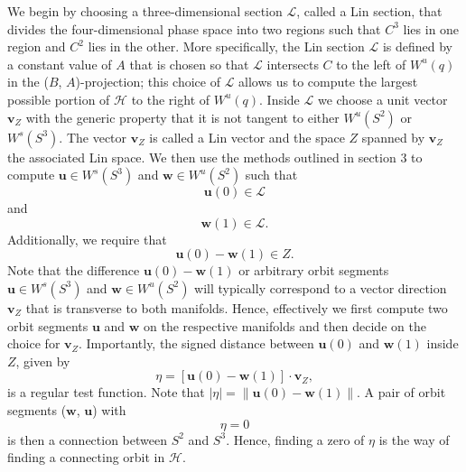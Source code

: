 \documentclass{ws-ijbc}
\begin{document}
We begin by choosing a three-dimensional section $\mathscr{L}$, called a Lin section, that divides the four-dimensional phase space into two regions such that $C^3$ lies in one region and $C^2$ lies in the other.  More specifically, the Lin section $\mathscr{L}$ is defined by a constant value of $A$ that is chosen so that $\mathscr{L}$ intersects $C$ to the left of $W^u(q)$ in the ($B$, $A$)-projection; this choice of $\mathscr{L}$ allows us to compute the largest possible portion of $\mathscr{H}$ to the right of $W^u(q)$.  Inside $\mathscr{L}$ we choose a unit vector $\mathbf{v}_Z$ with the generic property that it is not tangent to either $W^u(S^2)$ or $W^s(S^3)$.  The vector $\mathbf{v}_Z$ is called a Lin vector and the space $Z$ spanned by $\mathbf{v}_Z$ the associated Lin space.  We then use the methods outlined in section 3 to compute $\mathbf{u} \in W^s(S^3)$ and $\mathbf{w} \in W^u(S^2)$ such that
\begin{equation}
	\mathbf{u}(0) \in \mathscr{L}
	\label{general_conditions_heteroclinic_1}
\end{equation}
and
\begin{equation}	
	 \mathbf{w}(1) \in \mathscr{L}.
	 \label{general_conditions_heteroclinic_2}
\end{equation}
Additionally, we require that
\begin{equation*}
	\mathbf{u}(0)-\mathbf{w}(1) \in Z.
\end{equation*}
Note that the difference $\mathbf{u}(0)-\mathbf{w}(1)$ or arbitrary orbit segments $\mathbf{u} \in W^s(S^3)$ and $\mathbf{w} \in W^u(S^2)$ will typically correspond to a vector direction $\mathbf{v}_Z$ that is transverse to both manifolds.  Hence, effectively we first compute two orbit segments $\mathbf{u}$ and $\mathbf{w}$ on the respective manifolds and then decide on the choice for $\mathbf{v}_Z$.  Importantly, the signed distance between $\mathbf{u}(0)$ and $\mathbf{w}(1)$ inside $Z$, given by
\begin{equation}
	\eta=[\mathbf{u}(0)-\mathbf{w}(1)] \cdot \mathbf{v}_Z,
	\label{general_conditions_heteroclinic_3}
\end{equation}
is a regular test function.  Note that $\left\lvert \eta \right\lvert = \left\lVert \mathbf{u}(0)-\mathbf{w}(1) \right\lVert$.  A pair of orbit segments ($\mathbf{w}$, $\mathbf{u}$) with 
\begin{equation}
	\eta = 0
	\label{general_conditions_heteroclinic_4}
\end{equation}
is then a connection between $S^2$ and $S^3$.  Hence, finding a zero of $\eta$ is the way of finding a connecting orbit in $\mathscr{H}$.
\end{document}
